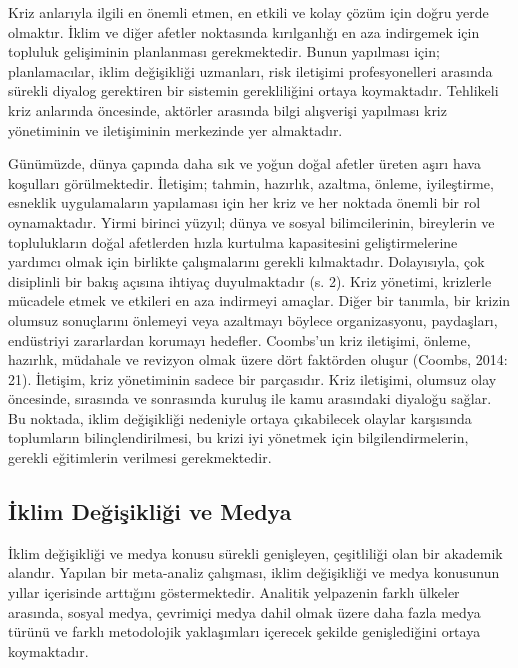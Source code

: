\documentclass[
]{book}
\begin{document}
Kriz anlarıyla ilgili en önemli etmen, en etkili ve kolay çözüm için doğru yerde olmaktır. İklim ve diğer afetler noktasında kırılganlığı en aza indirgemek için topluluk gelişiminin planlanması gerekmektedir. Bunun yapılması için; planlamacılar, iklim değişikliği uzmanları, risk iletişimi profesyonelleri arasında sürekli diyalog gerektiren bir sistemin gerekliliğini ortaya koymaktadır. Tehlikeli kriz anlarında öncesinde, aktörler arasında bilgi alışverişi yapılması kriz yönetiminin ve iletişiminin merkezinde yer almaktadır. \citep{drake2016communicating}

Günümüzde, dünya çapında daha sık ve yoğun doğal afetler üreten aşırı hava koşulları görülmektedir. İletişim; tahmin, hazırlık, azaltma, önleme, iyileştirme, esneklik uygulamaların yapılaması için her kriz ve her noktada önemli bir rol oynamaktadır. Yirmi birinci yüzyıl; dünya ve sosyal bilimcilerinin, bireylerin ve toplulukların doğal afetlerden hızla kurtulma kapasitesini geliştirmelerine yardımcı olmak için birlikte çalışmalarını gerekli kılmaktadır. Dolayısıyla, çok disiplinli bir bakış açısına ihtiyaç duyulmaktadır (s. 2). \citep{drake2016communicating} Kriz yönetimi, krizlerle mücadele etmek ve etkileri en aza indirmeyi amaçlar. Diğer bir tanımla, bir krizin olumsuz sonuçlarını önlemeyi veya azaltmayı böylece organizasyonu, paydaşları, endüstriyi zararlardan korumayı hedefler. Coombs'un kriz iletişimi, önleme, hazırlık, müdahale ve revizyon olmak üzere dört faktörden oluşur (Coombs, 2014: 21). İletişim, kriz yönetiminin sadece bir parçasıdır. Kriz iletişimi, olumsuz olay öncesinde, sırasında ve sonrasında kuruluş ile kamu arasındaki diyaloğu sağlar. Bu noktada, iklim değişikliği nedeniyle ortaya çıkabilecek olaylar karşısında toplumların bilinçlendirilmesi, bu krizi iyi yönetmek için bilgilendirmelerin, gerekli eğitimlerin verilmesi gerekmektedir.

\hypertarget{iklim-deux11fiux15fikliux11fi-ve-medya}{%
\subsection{İklim Değişikliği ve Medya}\label{iklim-deux11fiux15fikliux11fi-ve-medya}}

İklim değişikliği ve medya konusu sürekli genişleyen, çeşitliliği olan bir akademik alandır. Yapılan bir meta-analiz çalışması, iklim değişikliği ve medya konusunun yıllar içerisinde arttığını göstermektedir. Analitik yelpazenin farklı ülkeler arasında, sosyal medya, çevrimiçi medya dahil olmak üzere daha fazla medya türünü ve farklı metodolojik yaklaşımları içerecek şekilde genişlediğini ortaya koymaktadır. \citep{schaefer2014media}
\end{document}
